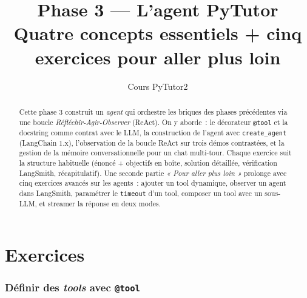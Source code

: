 \documentclass[11pt,a4paper]{article}
\title{\textbf{Phase 3 — L'agent PyTutor}\\
\large Quatre concepts essentiels + cinq exercices pour aller plus loin}
\author{Cours PyTutor2}
\date{}
\begin{document}
\maketitle

\begin{abstract}
\noindent
Cette phase 3 construit un \emph{agent} qui orchestre les briques des
phases précédentes via une boucle \emph{Réfléchir-Agir-Observer} (ReAct).
On y aborde~: le décorateur \texttt{@tool} et la docstring comme
contrat avec le LLM, la construction de l'agent avec
\texttt{create\_agent} (LangChain 1.x), l'observation de la boucle ReAct
sur trois démos contrastées, et la gestion de la mémoire
conversationnelle pour un chat multi-tour. Chaque exercice suit la
structure habituelle (énoncé + objectifs en boîte, solution détaillée,
vérification LangSmith, récapitulatif). Une seconde partie
\emph{« Pour aller plus loin »} prolonge avec cinq exercices avancés sur
les agents~: ajouter un tool dynamique, observer un agent dans LangSmith,
paramétrer le \texttt{timeout} d'un tool, composer un tool avec un
sous-LLM, et streamer la réponse en deux modes.
\end{abstract}

\tableofcontents
\bigskip

\part{Exercices}

\section{Définir des \emph{tools} avec \texttt{@tool}}
\end{document}
